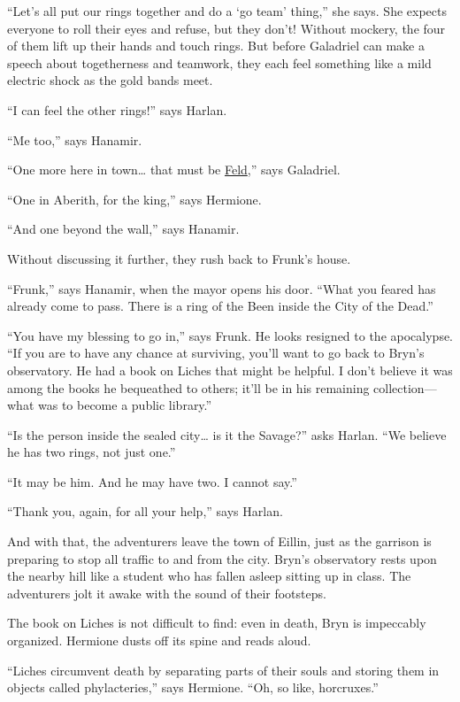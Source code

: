 \documentclass[smalldemyvopaper,11pt,twoside,onecolumn,openright,extrafontsizes]{memoir}
\begin{document}
``Let's all put our rings together and do a `go team' thing,'' she says.
She expects everyone to roll their eyes and refuse, but they don't!
Without mockery, the four of them lift up their hands and touch rings.
But before Galadriel can make a speech about togetherness and teamwork,
they each feel something like a mild electric shock as the gold bands
meet.

``I can feel the other rings!'' says Harlan.

``Me too,'' says Hanamir.

``One more here in town\ldots{} that must be
\href{/characters/feld/}{Feld},'' says Galadriel.

``One in Aberith, for the king,'' says Hermione.

``And one beyond the wall,'' says Hanamir.

Without discussing it further, they rush back to Frunk's house.

``Frunk,'' says Hanamir, when the mayor opens his door. ``What you
feared has already come to pass. There is a ring of the Been inside the
City of the Dead.''

``You have my blessing to go in,'' says Frunk. He looks resigned to the
apocalypse. ``If you are to have any chance at surviving, you'll want to
go back to Bryn's observatory. He had a book on Liches that might be
helpful. I don't believe it was among the books he bequeathed to others;
it'll be in his remaining collection---what was to become a public
library.''

``Is the person inside the sealed city\ldots{} is it the Savage?'' asks
Harlan. ``We believe he has two rings, not just one.''

``It may be him. And he may have two. I cannot say.''

``Thank you, again, for all your help,'' says Harlan.

And with that, the adventurers leave the town of Eillin, just as the
garrison is preparing to stop all traffic to and from the city. Bryn's
observatory rests upon the nearby hill like a student who has fallen
asleep sitting up in class. The adventurers jolt it awake with the sound
of their footsteps.

The book on Liches is not difficult to find: even in death, Bryn is
impeccably organized. Hermione dusts off its spine and reads aloud.

``Liches circumvent death by separating parts of their souls and storing
them in objects called phylacteries,'' says Hermione. ``Oh, so like,
horcruxes.''
\end{document}
